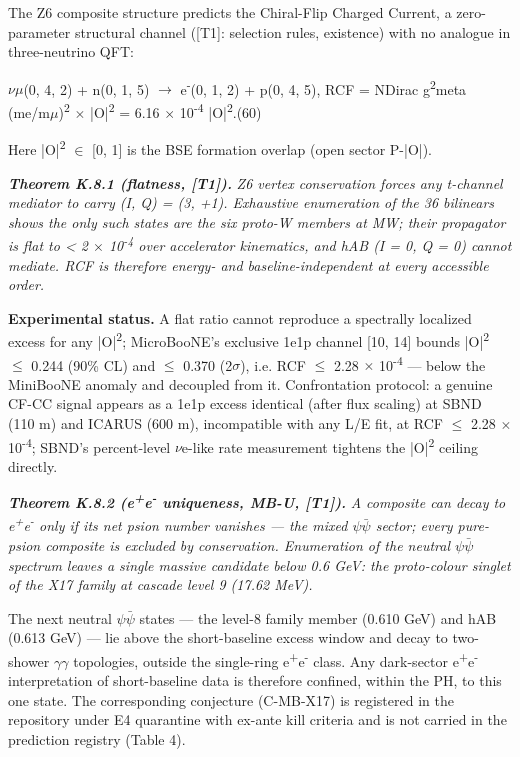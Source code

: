 \documentclass[11pt,letterpaper]{article}
\begin{document}
\noindent The Z6 composite structure predicts the Chiral-Flip Charged Current, a zero-parameter structural channel ([T1]: selection rules, existence) with no analogue in three-neutrino QFT:

\begingroup\centering $\nu$$\mu$(0, 4, 2) + n(0, 1, 5) $\to$ e\textsuperscript{-}(0, 1, 2) + p(0, 4, 5),   RCF = NDirac g\textsuperscript{2}meta (me/m$\mu$)\textsuperscript{2} $\times$ |O|\textsuperscript{2} = 6.16 $\times$ 10\textsuperscript{-4} |O|\textsuperscript{2}.\hspace{2em}(60)\par\endgroup

\noindent Here |O|\textsuperscript{2} $\in$ [0, 1] is the BSE formation overlap (open sector P-|O|).

\noindent \textbf{\textit{Theorem K.8.1 (flatness, [T1]). }}\textit{Z6 vertex conservation forces any t-channel mediator to carry (I, Q) = (3, +1). Exhaustive enumeration of the 36 bilinears shows the only such states are the six proto-W members at MW; their propagator is flat to < 2 $\times$ 10\textsuperscript{-4} over accelerator kinematics, and hAB (I = 0, Q = 0) cannot mediate. RCF is therefore energy- and baseline-independent at every accessible order.}

\noindent \textbf{Experimental status. }A flat ratio cannot reproduce a spectrally localized excess for any |O|\textsuperscript{2}; MicroBooNE's exclusive 1e1p channel [10, 14] bounds |O|\textsuperscript{2} $\le$ 0.244 (90\% CL) and $\le$ 0.370 (2$\sigma$), i.e. RCF $\le$ 2.28 $\times$ 10\textsuperscript{-4} --- below the MiniBooNE anomaly and decoupled from it. Confrontation protocol: a genuine CF-CC signal appears as a 1e1p excess identical (after flux scaling) at SBND (110 m) and ICARUS (600 m), incompatible with any L/E fit, at RCF $\le$ 2.28 $\times$ 10\textsuperscript{-4}; SBND's percent-level $\nu$e-like rate measurement tightens the |O|\textsuperscript{2} ceiling directly.

\noindent \textbf{\textit{Theorem K.8.2 (e\textsuperscript{+}e\textsuperscript{-} uniqueness, MB-U, [T1]). }}\textit{A composite can decay to e\textsuperscript{+}e\textsuperscript{-} only if its net psion number vanishes --- the mixed $\psi$$\bar{\psi}$ sector; every pure-psion composite is excluded by conservation. Enumeration of the neutral $\psi$$\bar{\psi}$ spectrum leaves a single massive candidate below 0.6 GeV: the proto-colour singlet of the X17 family at cascade level 9 (17.62 MeV).}

\noindent The next neutral $\psi$$\bar{\psi}$ states --- the level-8 family member (0.610 GeV) and hAB (0.613 GeV) --- lie above the short-baseline excess window and decay to two-shower $\gamma$$\gamma$ topologies, outside the single-ring e\textsuperscript{+}e\textsuperscript{-} class. Any dark-sector e\textsuperscript{+}e\textsuperscript{-} interpretation of short-baseline data is therefore confined, within the PH, to this one state. The corresponding conjecture (C-MB-X17) is registered in the repository under E4 quarantine with ex-ante kill criteria and is not carried in the prediction registry (Table 4).
\end{document}
